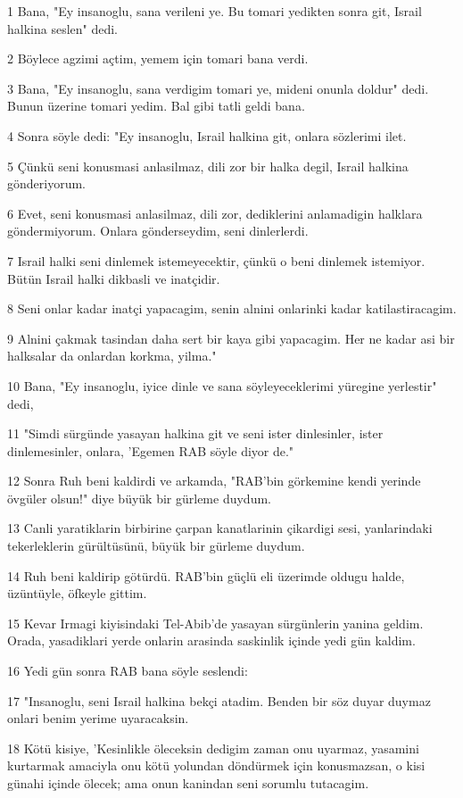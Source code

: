 \par 1 Bana, "Ey insanoglu, sana verileni ye. Bu tomari yedikten sonra git, Israil halkina seslen" dedi.
\par 2 Böylece agzimi açtim, yemem için tomari bana verdi.
\par 3 Bana, "Ey insanoglu, sana verdigim tomari ye, mideni onunla doldur" dedi. Bunun üzerine tomari yedim. Bal gibi tatli geldi bana.
\par 4 Sonra söyle dedi: "Ey insanoglu, Israil halkina git, onlara sözlerimi ilet.
\par 5 Çünkü seni konusmasi anlasilmaz, dili zor bir halka degil, Israil halkina gönderiyorum.
\par 6 Evet, seni konusmasi anlasilmaz, dili zor, dediklerini anlamadigin halklara göndermiyorum. Onlara gönderseydim, seni dinlerlerdi.
\par 7 Israil halki seni dinlemek istemeyecektir, çünkü o beni dinlemek istemiyor. Bütün Israil halki dikbasli ve inatçidir.
\par 8 Seni onlar kadar inatçi yapacagim, senin alnini onlarinki kadar katilastiracagim.
\par 9 Alnini çakmak tasindan daha sert bir kaya gibi yapacagim. Her ne kadar asi bir halksalar da onlardan korkma, yilma."
\par 10 Bana, "Ey insanoglu, iyice dinle ve sana söyleyeceklerimi yüregine yerlestir" dedi,
\par 11 "Simdi sürgünde yasayan halkina git ve seni ister dinlesinler, ister dinlemesinler, onlara, 'Egemen RAB söyle diyor de."
\par 12 Sonra Ruh beni kaldirdi ve arkamda, "RAB'bin görkemine kendi yerinde övgüler olsun!" diye büyük bir gürleme duydum.
\par 13 Canli yaratiklarin birbirine çarpan kanatlarinin çikardigi sesi, yanlarindaki tekerleklerin gürültüsünü, büyük bir gürleme duydum.
\par 14 Ruh beni kaldirip götürdü. RAB'bin güçlü eli üzerimde oldugu halde, üzüntüyle, öfkeyle gittim.
\par 15 Kevar Irmagi kiyisindaki Tel-Abib'de yasayan sürgünlerin yanina geldim. Orada, yasadiklari yerde onlarin arasinda saskinlik içinde yedi gün kaldim.
\par 16 Yedi gün sonra RAB bana söyle seslendi:
\par 17 "Insanoglu, seni Israil halkina bekçi atadim. Benden bir söz duyar duymaz onlari benim yerime uyaracaksin.
\par 18 Kötü kisiye, 'Kesinlikle öleceksin dedigim zaman onu uyarmaz, yasamini kurtarmak amaciyla onu kötü yolundan döndürmek için konusmazsan, o kisi günahi içinde ölecek; ama onun kanindan seni sorumlu tutacagim.
